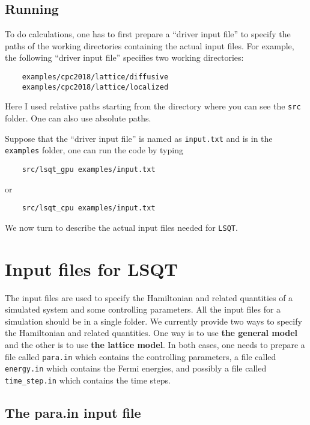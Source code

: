 \documentclass[12pt,a4paper]{report}
\begin{document}
\subsection{Running}

To do calculations, one has to first prepare a ``driver input file'' to specify the paths of the working directories containing the actual input files. For example, the following ``driver input file'' specifies two working directories:
\begin{verbatim}
    examples/cpc2018/lattice/diffusive
    examples/cpc2018/lattice/localized
\end{verbatim}
Here I used relative paths starting from the directory where you can see the \verb"src" folder. One can also use absolute paths.

Suppose that the ``driver input file'' is named as \verb"input.txt" and is in the \verb"examples" folder, one can run the code by typing
\begin{verbatim}
    src/lsqt_gpu examples/input.txt
\end{verbatim}
or 
\begin{verbatim}
    src/lsqt_cpu examples/input.txt
\end{verbatim}

We now turn to describe the actual input files needed for \verb"LSQT".

\section{Input files for LSQT}

The input files are used to specify the Hamiltonian and related quantities of a simulated system and some controlling parameters. All the input files for a simulation should be in a single folder. We currently provide two ways to specify the Hamiltonian and related quantities. One way is to use \textbf{the general model} and the other is to use \textbf{the lattice model}. In both cases, one needs to prepare a file called \verb"para.in" which contains the controlling parameters, a file called \verb"energy.in" which contains the Fermi energies, and possibly a file called \verb"time_step.in" which contains the time steps.

\subsection{The para.in input file}
\end{document}
